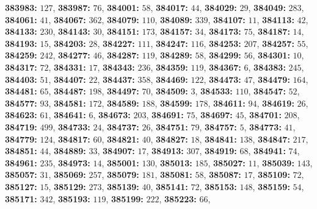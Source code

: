 \textsf{\bfseries 383983:} $127$, \textsf{\bfseries 383987:} $76$, \textsf{\bfseries 384001:} $58$, \textsf{\bfseries 384017:} $44$, \textsf{\bfseries 384029:} $29$, \textsf{\bfseries 384049:} $283$, \textsf{\bfseries 384061:} $41$, \textsf{\bfseries 384067:} $362$, \textsf{\bfseries 384079:} $110$, \textsf{\bfseries 384089:} $339$, \textsf{\bfseries 384107:} $11$, \textsf{\bfseries 384113:} $42$, \textsf{\bfseries 384133:} $230$, \textsf{\bfseries 384143:} $30$, \textsf{\bfseries 384151:} $173$, \textsf{\bfseries 384157:} $34$, \textsf{\bfseries 384173:} $75$, \textsf{\bfseries 384187:} $14$, \textsf{\bfseries 384193:} $15$, \textsf{\bfseries 384203:} $28$, \textsf{\bfseries 384227:} $111$, \textsf{\bfseries 384247:} $116$, \textsf{\bfseries 384253:} $207$, \textsf{\bfseries 384257:} $55$, \textsf{\bfseries 384259:} $242$, \textsf{\bfseries 384277:} $46$, \textsf{\bfseries 384287:} $119$, \textsf{\bfseries 384289:} $58$, \textsf{\bfseries 384299:} $56$, \textsf{\bfseries 384301:} $10$, \textsf{\bfseries 384317:} $72$, \textsf{\bfseries 384331:} $17$, \textsf{\bfseries 384343:} $236$, \textsf{\bfseries 384359:} $119$, \textsf{\bfseries 384367:} $6$, \textsf{\bfseries 384383:} $245$, \textsf{\bfseries 384403:} $51$, \textsf{\bfseries 384407:} $22$, \textsf{\bfseries 384437:} $358$, \textsf{\bfseries 384469:} $122$, \textsf{\bfseries 384473:} $47$, \textsf{\bfseries 384479:} $164$, \textsf{\bfseries 384481:} $65$, \textsf{\bfseries 384487:} $198$, \textsf{\bfseries 384497:} $70$, \textsf{\bfseries 384509:} $3$, \textsf{\bfseries 384533:} $110$, \textsf{\bfseries 384547:} $52$, \textsf{\bfseries 384577:} $93$, \textsf{\bfseries 384581:} $172$, \textsf{\bfseries 384589:} $188$, \textsf{\bfseries 384599:} $178$, \textsf{\bfseries 384611:} $94$, \textsf{\bfseries 384619:} $26$, \textsf{\bfseries 384623:} $61$, \textsf{\bfseries 384641:} $6$, \textsf{\bfseries 384673:} $203$, \textsf{\bfseries 384691:} $75$, \textsf{\bfseries 384697:} $45$, \textsf{\bfseries 384701:} $208$, \textsf{\bfseries 384719:} $499$, \textsf{\bfseries 384733:} $24$, \textsf{\bfseries 384737:} $26$, \textsf{\bfseries 384751:} $79$, \textsf{\bfseries 384757:} $5$, \textsf{\bfseries 384773:} $41$, \textsf{\bfseries 384779:} $124$, \textsf{\bfseries 384817:} $60$, \textsf{\bfseries 384821:} $40$, \textsf{\bfseries 384827:} $18$, \textsf{\bfseries 384841:} $138$, \textsf{\bfseries 384847:} $217$, \textsf{\bfseries 384851:} $44$, \textsf{\bfseries 384889:} $33$, \textsf{\bfseries 384907:} $17$, \textsf{\bfseries 384913:} $307$, \textsf{\bfseries 384919:} $68$, \textsf{\bfseries 384941:} $74$, \textsf{\bfseries 384961:} $235$, \textsf{\bfseries 384973:} $14$, \textsf{\bfseries 385001:} $130$, \textsf{\bfseries 385013:} $185$, \textsf{\bfseries 385027:} $11$, \textsf{\bfseries 385039:} $143$, \textsf{\bfseries 385057:} $31$, \textsf{\bfseries 385069:} $257$, \textsf{\bfseries 385079:} $181$, \textsf{\bfseries 385081:} $58$, \textsf{\bfseries 385087:} $17$, \textsf{\bfseries 385109:} $72$, \textsf{\bfseries 385127:} $15$, \textsf{\bfseries 385129:} $273$, \textsf{\bfseries 385139:} $40$, \textsf{\bfseries 385141:} $72$, \textsf{\bfseries 385153:} $148$, \textsf{\bfseries 385159:} $54$, \textsf{\bfseries 385171:} $342$, \textsf{\bfseries 385193:} $119$, \textsf{\bfseries 385199:} $222$, \textsf{\bfseries 385223:} $66$, 
